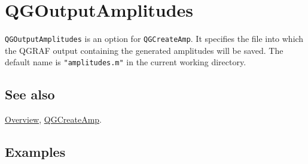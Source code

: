 \documentclass[../FeynHelpersManual.tex]{subfiles}
\begin{document}
\hypertarget{qgoutputamplitudes}{
\section{QGOutputAmplitudes}\label{qgoutputamplitudes}}

\texttt{QGOutputAmplitudes} is an option for \texttt{QGCreateAmp}. It
specifies the file into which the QGRAF output containing the generated
amplitudes will be saved. The default name is \texttt{"amplitudes.m"} in
the current working directory.

\subsection{See also}

\hyperlink{toc}{Overview}, \hyperlink{qgcreateamp}{QGCreateAmp}.

\subsection{Examples}
\end{document}
